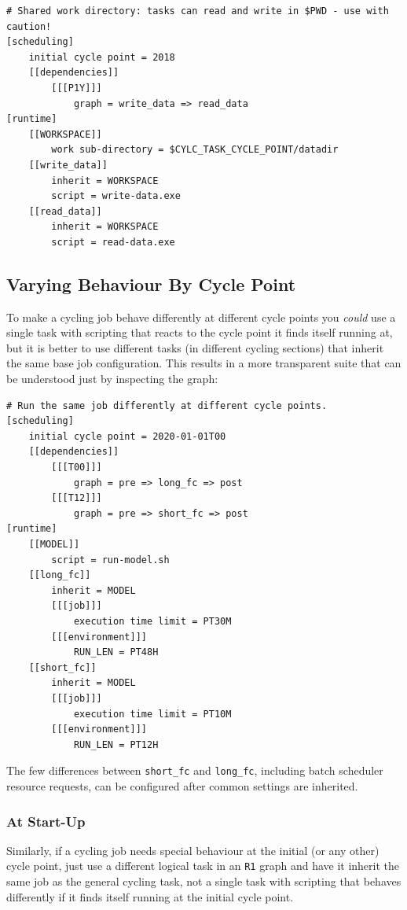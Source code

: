 \lstset{language=suiterc}
\begin{lstlisting}
# Shared work directory: tasks can read and write in $PWD - use with caution!
[scheduling]
    initial cycle point = 2018
    [[dependencies]]
        [[[P1Y]]]
            graph = write_data => read_data
[runtime]
    [[WORKSPACE]]
        work sub-directory = $CYLC_TASK_CYCLE_POINT/datadir
    [[write_data]]
        inherit = WORKSPACE
        script = write-data.exe
    [[read_data]]
        inherit = WORKSPACE
        script = read-data.exe
\end{lstlisting}

\subsection{Varying Behaviour By Cycle Point}

To make a cycling job behave differently at different cycle points you {\em
could} use a single task with scripting that reacts to the cycle point it finds
itself running at, but it is better to use different tasks (in different
cycling sections) that inherit the same base job configuration. This results
in a more transparent suite that can be understood just by inspecting the
graph:

\lstset{language=suiterc}
\begin{lstlisting}
# Run the same job differently at different cycle points.
[scheduling]
    initial cycle point = 2020-01-01T00
    [[dependencies]]
        [[[T00]]]
            graph = pre => long_fc => post
        [[[T12]]]
            graph = pre => short_fc => post
[runtime]
    [[MODEL]]
        script = run-model.sh
    [[long_fc]]
        inherit = MODEL
        [[[job]]]
            execution time limit = PT30M
        [[[environment]]]
            RUN_LEN = PT48H
    [[short_fc]]
        inherit = MODEL
        [[[job]]]
            execution time limit = PT10M
        [[[environment]]]
            RUN_LEN = PT12H
\end{lstlisting}

The few differences between \lstinline=short_fc= and \lstinline=long_fc=,
including batch scheduler resource requests, can be configured after common
settings are inherited.

\subsubsection{At Start-Up}

Similarly, if a cycling job needs special behaviour at the initial (or any other)
cycle point, just use a different logical task in an \lstinline=R1= graph and
have it inherit the same job as the general cycling task, not a single task
with scripting that behaves differently if it finds itself running at the
initial cycle point.

